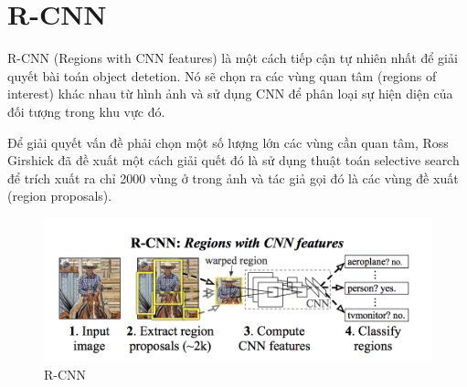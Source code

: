\section{R-CNN}
R-CNN (Regions with CNN features) \cite{rcnn} là một cách tiếp cận tự nhiên nhất để giải quyết bài toán object detetion. Nó sẽ chọn ra các vùng quan tâm (regions of interest) khác nhau từ hình ảnh và sử dụng CNN để phân loại sự hiện diện của đối tượng trong khu vực đó.\par
Để giải quyết vấn đề phải chọn một số lượng lớn các vùng cần quan tâm, Ross Girshick đã đề xuất một cách giải quết đó là sử dụng thuật toán selective search \cite{van2011segmentation} để trích xuất ra chỉ 2000 vùng ở trong ảnh và tác giả gọi đó là các vùng đề xuất (region proposals). 
\begin{figure}[H]
\begin{center}
\includegraphics[scale=0.3]{chap4/image/rcnn.png}
\caption{R-CNN}
\end{center}
\end{figure}
 
